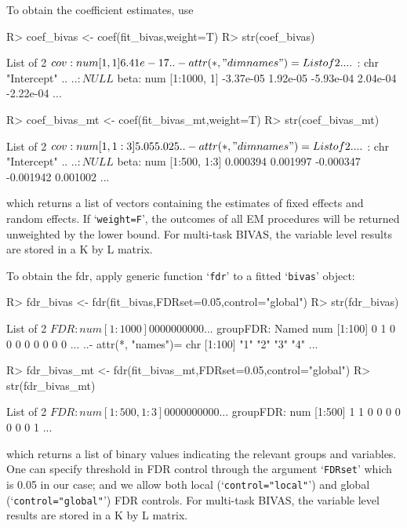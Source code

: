 \documentclass[11pt]{article}
\begin{document}
To obtain the coefficient estimates, use
\begin{Schunk}
\begin{Sinput}
R> coef_bivas <- coef(fit_bivas,weight=T)
R> str(coef_bivas)
\end{Sinput}
\begin{Soutput}
List of 2
 $ cov : num [1, 1] 6.41e-17
  ..- attr(*, "dimnames")=List of 2
  .. ..$ : chr "Intercept"
  .. ..$ : NULL
 $ beta: num [1:1000, 1] -3.37e-05 1.92e-05 -5.93e-04 2.04e-04 -2.22e-04 ...
\end{Soutput}
\begin{Sinput}
R> coef_bivas_mt <- coef(fit_bivas_mt,weight=T)
R> str(coef_bivas_mt)
\end{Sinput}
\begin{Soutput}
List of 2
 $ cov : num [1, 1:3] 5.05 5.02 5
  ..- attr(*, "dimnames")=List of 2
  .. ..$ : chr "Intercept"
  .. ..$ : NULL
 $ beta: num [1:500, 1:3] 0.000394 0.001997 -0.000347 -0.001942 0.001002 ...
\end{Soutput}
\end{Schunk}
which returns a list of vectors containing the estimates of fixed effects and random effects. If `\texttt{weight=F}', the outcomes of all EM procedures will be returned unweighted by the lower bound. For multi-task BIVAS, the variable level results are stored in a K by L matrix.

To obtain the fdr, apply generic function `\texttt{fdr}' to a fitted `\texttt{bivas}' object:
\begin{Schunk}
\begin{Sinput}
R> fdr_bivas <- fdr(fit_bivas,FDRset=0.05,control="global")
R> str(fdr_bivas)
\end{Sinput}
\begin{Soutput}
List of 2
 $ FDR     : num [1:1000] 0 0 0 0 0 0 0 0 0 0 ...
 $ groupFDR: Named num [1:100] 0 1 0 0 0 0 0 0 0 0 ...
  ..- attr(*, "names")= chr [1:100] "1" "2" "3" "4" ...
\end{Soutput}
\begin{Sinput}
R> fdr_bivas_mt <- fdr(fit_bivas_mt,FDRset=0.05,control="global")
R> str(fdr_bivas_mt)
\end{Sinput}
\begin{Soutput}
List of 2
 $ FDR     : num [1:500, 1:3] 0 0 0 0 0 0 0 0 0 0 ...
 $ groupFDR: num [1:500] 1 1 0 0 0 0 0 0 0 1 ...
\end{Soutput}
\end{Schunk}
which returns a list of binary values indicating the relevant groups and variables. One can specify threshold in FDR control through the argument `\texttt{FDRset}' which is 0.05 in our case; and we allow both local (`\texttt{control="local"}') and global (`\texttt{control="global"}') FDR controls. For multi-task BIVAS, the variable level results are stored in a K by L matrix.
\end{document}
